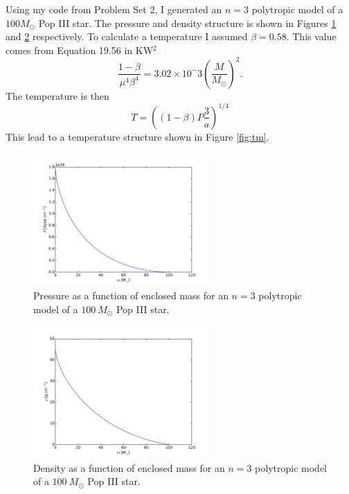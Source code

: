\documentclass[12pt]{paper}
\begin{document}
Using my code from Problem Set 2, I generated an $n=3$ polytropic model of a $100M_\odot$ Pop III star. The pressure and density structure is shown in Figures \ref{fig:pm} and \ref{fig:dm} respectively. To calculate a temperature I assumed $\beta=0.58$. This value comes from Equation 19.56 in KW$^2$ 
\begin{equation}\label{eq:beta}
\frac{1-\beta}{\mu^4\beta^4}=3.02\times10^-3\left(\frac{M}{M_\odot}\right)^2.
\end{equation}
The temperature is then 
\begin{equation}\label{eq:temp}
T=\left((1-\beta)P\frac{3}{a}\right)^{1/4}
\end{equation}
This lead to a temperature structure shown in Figure \ref{fig:tm}.

\begin{figure}
\begin{center}
    \includegraphics[width=0.6\textwidth]{pressure3p0.pdf}
    \caption{Pressure as a function of enclosed mass for an $n=3$ polytropic model of a $100~M_\odot$ Pop III star.}
    \label{fig:pm}
\end{center}
\end{figure}

\begin{figure}
\begin{center}
    \includegraphics[width=0.6\textwidth]{density3p0.pdf}
    \caption{Density as a function of enclosed mass for an $n=3$ polytropic model of a $100~M_\odot$ Pop III star.}
    \label{fig:dm}
\end{center}
\end{figure}
\end{document}
